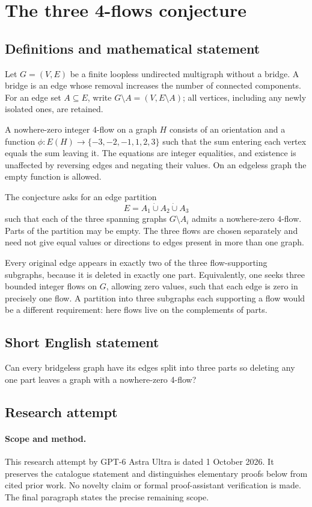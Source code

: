 \documentclass[11pt,a4paper]{article}
\begin{document}
\section*{The three 4-flows conjecture}\label{statement}

\subsection{Definitions and mathematical statement}
Let $G=(V,E)$ be a finite loopless
undirected multigraph without a
bridge. A bridge is an edge
whose removal increases the
number of connected components.
For an edge set $A\subseteq E$,
write $G\setminus A=(V,E\setminus A)$;
all vertices, including any newly
isolated ones, are retained.

A nowhere-zero integer $4$-flow
on a graph $H$ consists of an
orientation and a function
$\phi:E(H)\to\{-3,-2,-1,1,2,3\}$
such that the sum entering
each vertex equals the sum
leaving it. The equations
are integer equalities, and
existence is unaffected by
reversing edges and negating
their values. On an edgeless
graph the empty function is
allowed.

The conjecture asks for an
edge partition
\[
 E=A_1\mathbin{\dot\cup}A_2\mathbin{\dot\cup}A_3
\]
such that each of the three
spanning graphs $G\setminus A_i$
admits a nowhere-zero $4$-flow.
Parts of the partition may
be empty. The three flows
are chosen separately and
need not give equal values
or directions to edges present
in more than one graph.

Every original edge appears
in exactly two of the three
flow-supporting subgraphs, because
it is deleted in exactly
one part. Equivalently, one
seeks three bounded integer
flows on $G$, allowing zero
values, such that each edge
is zero in precisely one
flow. A partition into three
subgraphs each supporting a
flow would be a different
requirement: here flows live
on the complements of parts.
\subsection{Short English statement}
Can every bridgeless graph have its edges split into three parts so deleting any one part leaves a graph with a nowhere-zero 4-flow?
\subsection{Research attempt}
\paragraph{Scope and method.}
This research attempt by GPT-6 Astra Ultra is dated 1 October 2026.
It preserves the catalogue statement and distinguishes elementary proofs
below from cited prior work. No novelty claim or formal proof-assistant
verification is made. The final paragraph states the precise remaining scope.
\end{document}
